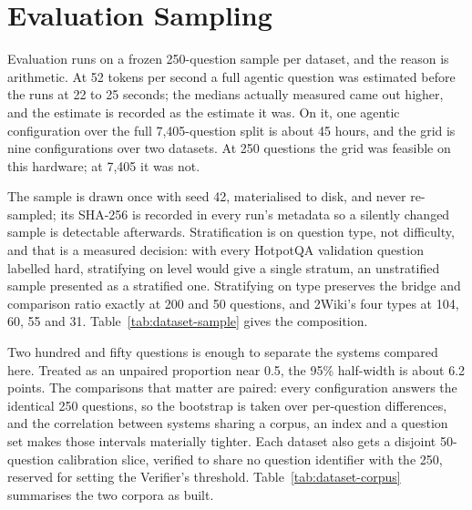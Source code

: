 \section{Evaluation Sampling}
\label{sec:sampling}

Evaluation runs on a frozen 250-question sample per dataset, and the reason is
arithmetic. At 52 tokens per second a full agentic question was estimated
before the runs at 22 to 25 seconds; the medians actually measured came out
higher, and the estimate is recorded as the estimate it was. On it, one agentic
configuration over the full 7{,}405-question split is about 45 hours, and the
grid is nine configurations over two datasets. At 250 questions the grid was
feasible on this hardware; at 7{,}405 it was not.

The sample is drawn once with seed 42, materialised to disk, and never
re-sampled; its SHA-256 is recorded in every run's metadata so a silently
changed sample is detectable afterwards. Stratification is on question type,
not difficulty, and that is a measured decision: with every HotpotQA
validation question labelled hard, stratifying on level would give a single
stratum, an unstratified sample presented as a stratified one. Stratifying on
type preserves the bridge and comparison ratio exactly at 200 and 50
questions, and 2Wiki's four types at 104, 60, 55 and 31.
Table~\ref{tab:dataset-sample} gives the composition.

Two hundred and fifty questions is enough to separate the systems compared
here. Treated as an unpaired proportion near 0.5, the 95\% half-width is about
6.2 points. The comparisons that matter are paired: every configuration
answers the identical 250 questions, so the bootstrap is taken over
per-question differences, and the correlation between systems sharing a
corpus, an index and a question set makes those intervals materially tighter.
Each dataset also gets a disjoint 50-question calibration slice, verified to
share no question identifier with the 250, reserved for setting the Verifier's
threshold. Table~\ref{tab:dataset-corpus} summarises the two corpora as built.


